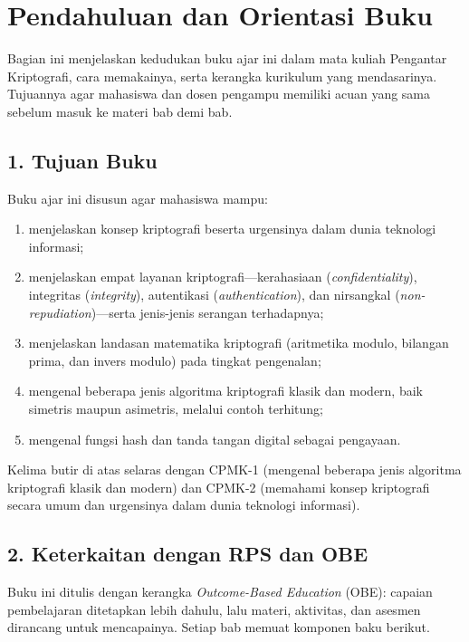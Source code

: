 \documentclass[../main.tex]{subfiles}
\begin{document}
\chapter*{Pendahuluan dan Orientasi Buku}

Bagian ini menjelaskan kedudukan buku ajar ini dalam mata kuliah Pengantar
Kriptografi, cara memakainya, serta kerangka kurikulum yang mendasarinya.
Tujuannya agar mahasiswa dan dosen pengampu memiliki acuan yang sama sebelum
masuk ke materi bab demi bab.

\section*{1. Tujuan Buku}

Buku ajar ini disusun agar mahasiswa mampu:

\begin{enumerate}[label=\arabic*.]
    \item menjelaskan konsep kriptografi beserta urgensinya dalam dunia
          teknologi informasi;
    \item menjelaskan empat layanan kriptografi---kerahasiaan
          (\textit{confidentiality}), integritas (\textit{integrity}),
          autentikasi (\textit{authentication}), dan nirsangkal
          (\textit{non-repudiation})---serta jenis-jenis serangan terhadapnya;
    \item menjelaskan landasan matematika kriptografi (aritmetika modulo,
          bilangan prima, dan invers modulo) pada tingkat pengenalan;
    \item mengenal beberapa jenis algoritma kriptografi klasik dan modern, baik
          simetris maupun asimetris, melalui contoh terhitung;
    \item mengenal fungsi hash dan tanda tangan digital sebagai pengayaan.
\end{enumerate}

Kelima butir di atas selaras dengan CPMK-1 (mengenal beberapa jenis algoritma
kriptografi klasik dan modern) dan CPMK-2 (memahami konsep kriptografi secara
umum dan urgensinya dalam dunia teknologi informasi).

\section*{2. Keterkaitan dengan RPS dan OBE}

Buku ini ditulis dengan kerangka \textit{Outcome-Based Education} (OBE):
capaian pembelajaran ditetapkan lebih dahulu, lalu materi, aktivitas, dan
asesmen dirancang untuk mencapainya. Setiap bab memuat komponen baku berikut.
\end{document}
